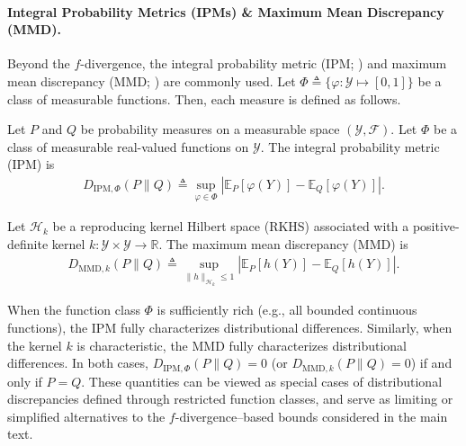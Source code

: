\paragraph{Integral Probability Metrics (IPMs) \& Maximum Mean Discrepancy (MMD).}
Beyond the $f$-divergence, the integral probability metric (IPM; \citealt{muller1997integral}) and maximum mean discrepancy (MMD; \citealt{gretton2012kernel}) are commonly used. Let $\Phi \triangleq \{\varphi: \mathcal{Y} \mapsto [0,1]\}$  be a class of measurable functions. Then, each measure is defined as follows. 
\begin{definition}
\label{def:ipm}
\normalfont
Let $P$ and $Q$ be probability measures on a measurable space $(\mathcal{Y}, \mathcal{F})$. Let $\Phi$ be a class of measurable real-valued functions on $\mathcal{Y}$. The integral probability metric (IPM) is 
\begin{align}
    D_{\mathrm{IPM},\Phi}(P \| Q) \triangleq  \sup_{\varphi \in \Phi} \left| \mathbb{E}_{P}[\varphi(Y)] - \mathbb{E}_{Q}[\varphi(Y)] \right|.
\end{align}
\end{definition}
\begin{definition}
\label{def:mmd}
\normalfont
Let $\mathcal{H}_k$ be a reproducing kernel Hilbert space (RKHS) associated with a positive-definite kernel $k:\mathcal{Y}\times\mathcal{Y}\to\mathbb{R}$. The maximum mean discrepancy (MMD) is 
\begin{align}
    D_{\mathrm{MMD},k}(P \| Q) \triangleq  \sup_{\|h\|_{\mathcal{H}_k} \le 1} \left| \mathbb{E}_{P}[h(Y)] - \mathbb{E}_{Q}[h(Y)] \right|.
\end{align}
\end{definition}

When the function class $\Phi$ is sufficiently rich (e.g., all bounded continuous functions), the IPM fully characterizes distributional differences. Similarly, when the kernel $k$ is characteristic, the MMD fully characterizes distributional differences. In both cases, $D_{\mathrm{IPM},\Phi}(P \| Q)=0$ (or $D_{\mathrm{MMD},k}(P \| Q)=0$) if and only if $P=Q$.
These quantities can be viewed as special cases of distributional discrepancies defined through restricted function classes, and serve as limiting or simplified alternatives to the $f$-divergence–based bounds considered in the main text.



